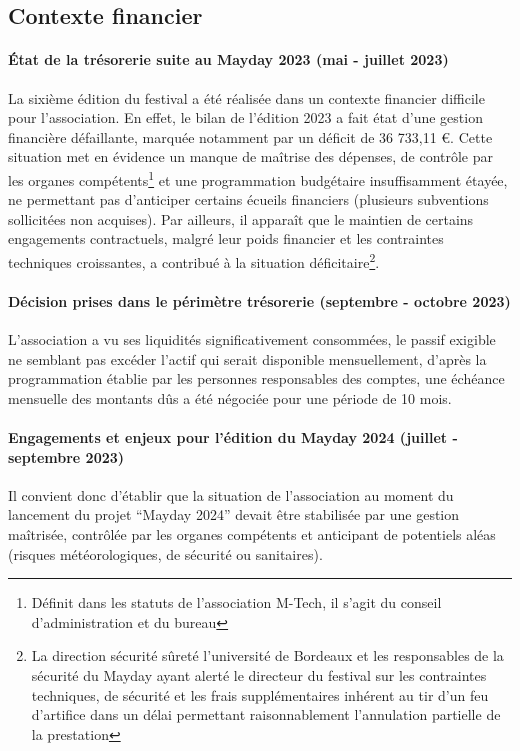 \documentclass[12pt,a4paper]{report}
\begin{document}
\subsection*{Contexte financier}

\paragraph*{État de la trésorerie suite au Mayday 2023 (mai - juillet 2023)}
La sixième édition du festival a été réalisée dans un contexte financier difficile pour l’association. En effet, le bilan de l'édition 2023 a fait état d'une gestion financière défaillante, marquée notamment par un déficit de 36 733,11 €. Cette situation met en évidence un manque de maîtrise des dépenses, de contrôle par les organes compétents\footnote{Définit dans les statuts de l'association M-Tech, il s'agit du conseil d'administration et du bureau} et une programmation budgétaire insuffisamment étayée, ne permettant pas d'anticiper certains écueils financiers (plusieurs subventions sollicitées non acquises). Par ailleurs, il apparaît que le maintien de certains engagements contractuels, malgré leur poids financier et les contraintes techniques croissantes, a contribué à la situation déficitaire\footnote{\sloppy La direction sécurité sûreté l'université de Bordeaux et les responsables de la sécurité du Mayday ayant alerté le directeur du festival sur les contraintes techniques, de sécurité et les frais supplémentaires inhérent au tir d'un feu d'artifice dans un délai permettant raisonnablement l'annulation partielle de la prestation}.

\paragraph*{Décision prises dans le périmètre trésorerie (septembre - octobre 2023)}
L'association a vu ses liquidités significativement consommées, le passif exigible ne semblant pas excéder l'actif qui serait disponible mensuellement, d'après la programmation établie par les personnes responsables des comptes, une échéance mensuelle des montants dûs a été négociée pour une période de 10 mois.

\paragraph*{Engagements et enjeux pour l'édition du Mayday 2024 (juillet - septembre 2023)}
Il convient donc d'établir que la situation de l'association au moment du lancement du projet “Mayday 2024” devait être stabilisée par une gestion maîtrisée, contrôlée par les organes compétents et anticipant de potentiels aléas (risques météorologiques, de sécurité ou sanitaires).
\end{document}
